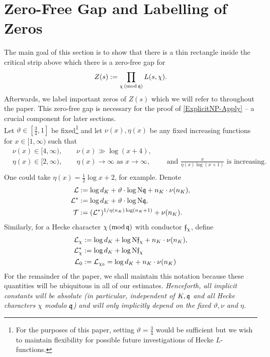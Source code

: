 \documentclass[12pt,psamsfonts]{amsart}
\theoremstyle{definition}
\theoremstyle{remark}
\numberwithin{equation}{section}
\newcounter{notation}
\begin{document}
\section{Zero-Free Gap and Labelling of Zeros}
\label{sec:ZeroFreeGap_and_BadZeros}
The main goal of this section is to show that there is a thin rectangle inside the critical strip above which there is a zero-free gap for 
\[
Z(s) := \prod_{\chi \, (\mathrm{mod} {\, \mathfrak{q}})} L(s,\chi). 
\]
Afterwards, we label important zeros of $Z(s)$ which we will refer to throughout the paper.  This zero-free gap is necessary for the proof of \cref{ExplicitNP-Apply} -- a crucial component for later sections.  \\

Let $\vartheta \in [\tfrac{3}{4}, 1]$ be fixed\footnote{For the purposes of this paper, setting $\vartheta = \tfrac{3}{4}$ would be sufficient but we wish to maintain flexibility for possible future investigations of Hecke $L$-functions.} and let $\nu(x), \eta(x)$ be any fixed increasing functions for $x \in [1,\infty)$ such that
\begin{equation}
\begin{aligned}
& \nu(x) \in [4,\infty), \qquad \nu(x) \gg \log(x+4), \\
& \eta(x) \in [2,\infty), \qquad \eta(x) \rightarrow \infty \text{ as } x \rightarrow \infty, \qquad \text{ and } \tfrac{x}{\eta(x) \log(x+1)} \text{ is increasing.} \\
\end{aligned}
\label{NuFunction}
\end{equation}
One could take $\eta(x) = \tfrac{1}{2}\log x + 2$, for example. Denote
\begin{equation}
\begin{aligned}
\mathcal{L} & := \log d_K + \vartheta \cdot \log \mathrm{N}\mathfrak{q} + n_K \cdot \nu(n_K) , \\
\mathcal{L}^* & := \log d_K + \vartheta \cdot \log \mathrm{N}\mathfrak{q},  \\
\mathcal{T} & := (\mathcal{L}^*)^{1/ \eta(n_K)\log(n_K+1)} +  \nu( n_K). 
\end{aligned}
\label{cL-definition}
\end{equation}
Similarly, for a Hecke character $\chi \, (\mathrm{mod} {\, \mathfrak{q}})$ with conductor $\mathfrak{f}_{\chi}$, define
\begin{equation}
\label{cL-definition-1}
\begin{aligned}
\mathcal{L}_{\chi} & :=  \log d_K + \log \mathrm{N}\mathfrak{f}_{\chi} +  n_K \cdot \nu(n_K), \\
\mathcal{L}_{\chi}^* & :=  \log d_K + \log \mathrm{N}\mathfrak{f}_{\chi} \\
\mathcal{L}_0 & := \mathcal{L}_{\chi_0} = \log d_K + n_K \cdot \nu(n_K)
\end{aligned}
\end{equation}
For the remainder of the paper, we shall maintain this notation because these quantities will be ubiquitous in all of our estimates. \emph{Henceforth, all implicit constants will be absolute (in particular, independent of $K, \mathfrak{q}$ and all Hecke characters $\chi$ modulo $\mathfrak{q}$) and will only implicitly depend on the fixed $\vartheta, \nu$ and $\eta$.}\\
\end{document}

